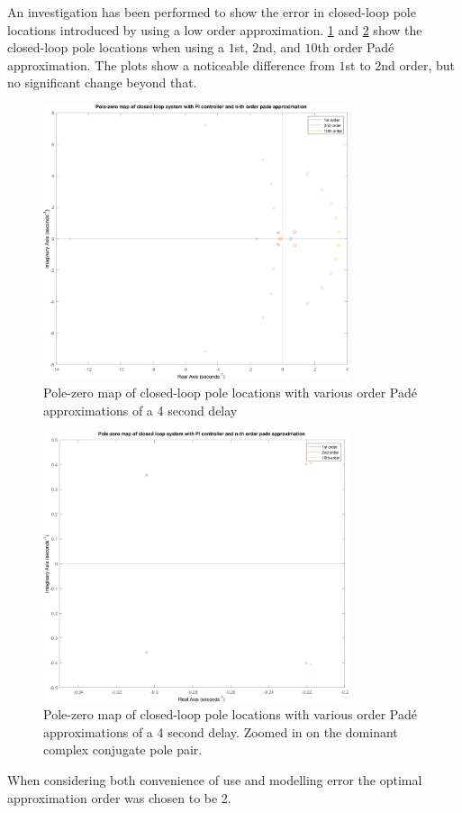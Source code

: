An investigation has been performed to show the error in closed-loop pole locations introduced by using a low order approximation. \cref{fig:CLPoles} and \cref{fig:CLPolesZoom} show the closed-loop pole locations when using a $1$st, $2$nd, and $10$th order Padé approximation. The plots show a noticeable difference from $1$st to $2$nd order, but no significant change beyond that.

\begin{figure}[h!]
	\centering
	\includegraphics[width=0.8\textwidth]{Pictures/PZmap_CL.png}
	\caption{Pole-zero map of closed-loop pole locations with various order Padé approximations of a 4 second delay}
	\label{fig:CLPoles}
\end{figure}
\begin{figure}[h!]
	\centering
	\includegraphics[width=0.8\textwidth]{Pictures/PZmap_CL_zoom.png}
	\caption{Pole-zero map of closed-loop pole locations with various order Padé approximations of a 4 second delay. Zoomed in on the dominant complex conjugate pole pair.}
	\label{fig:CLPolesZoom}
\end{figure}
When considering both convenience of use and modelling error the optimal approximation order was chosen to be 2.


